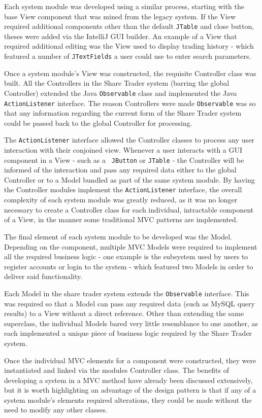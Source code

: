 \documentclass[12pt, a4paper,titlepage]{article}
\begin{document}
Each system module was developed using a similar process, starting with the
base View component that was mined from the legacy system. 
If the View required additional components other than the default {\tt JTable}
and close button, theses were added via the IntelliJ GUI builder. 
An example of a View that required additional editing was the View used to
display trading history - which featured a number of {\tt JTextFields} a user
could use to enter search parameters.

Once a system module’s View was constructed, the requisite Controller class
was built. 
All the Controllers in the Share Trader system (barring the global Controller)
extended the Java {\tt Observable} class and implemented the Java
{\tt ActionListener} interface. 
The reason Controllers were made {\tt Observable} was so that any information
regarding the current form of the Share Trader system could be passed back to
the global Controller for processing.  

The {\tt ActionListener} interface allowed the Controller classes to process any
user interaction with their conjoined view. 
Whenever a user interacts with a GUI component in a View - such as a {\tt
JButton} or {\tt JTable} - the Controller will be informed of the interaction
and pass any required data either to the global Controller or to a Model
bundled as part of the same system module.
By having the Controller modules implement the {\tt ActionListener} interface,
the overall complexity of each system module was greatly reduced, as it was no
longer necessary to create a Controller class for each individual, intractable
component of a View, in the manner some traditional MVC patterns are
implemented.

The final element of each system module to be developed was the Model. 
Depending on the component, multiple MVC Models were required to implement all
the required business logic - one example is the subsystem used by users to
register accounts or login to the system - which featured two Models in order
to deliver said functionality.

Each Model in the share trader system extends the {\tt Observable} interface. 
This was required so that a Model can pass any required data (such as MySQL
query results) to a View without a direct reference.
Other than extending the same superclass, the individual Models bared very
little resemblance to one another, as each implemented a unique piece of
business logic required by the Share Trader system.

Once the individual MVC elements for a component were constructed, they were
instantiated and linked via the modules Controller class. 
The benefits of developing a system in a MVC method have already been discussed
extensively, but it is worth highlighting an advantage of the design pattern
is that if any of a system module’s elements  required alterations, they could
be made without the need to modify any other classes.
\end{document}
